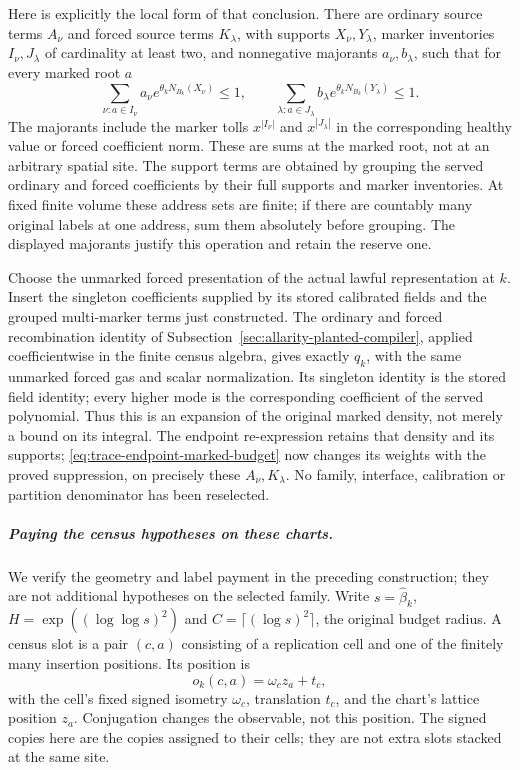 Here is explicitly the local form of that conclusion. There are
ordinary source terms $A_\nu$ and forced source terms $K_\lambda$,
with supports $X_\nu,Y_\lambda$, marker inventories
$I_\nu,J_\lambda$ of cardinality at least two, and nonnegative
majorants $a_\nu,b_\lambda$, such that for every marked root $a$
\[
 \sum_{\nu:a\in I_\nu}a_\nu e^{\theta_k N_{B_k}(X_\nu)}\le1,
 \qquad
 \sum_{\lambda:a\in J_\lambda}
             b_\lambda e^{\theta_k N_{B_k}(Y_\lambda)}\le1.
\]
The majorants include the marker tolls $x^{|I_\nu|}$ and
$x^{|J_\lambda|}$ in the corresponding healthy value or forced
coefficient norm. These are sums at the marked root, not at an
arbitrary spatial site. The support terms are obtained by grouping
the served ordinary and forced coefficients by their full supports
and marker inventories. At fixed finite volume these address sets
are finite; if there are countably many original labels at one
address, sum them absolutely before grouping. The displayed
majorants justify this operation and retain the reserve one.

Choose the unmarked forced presentation of the actual lawful
representation at $k$. Insert the singleton coefficients supplied by
its stored calibrated fields and the grouped multi-marker terms just
constructed. The ordinary and forced recombination identity of
Subsection~\ref{sec:allarity-planted-compiler}, applied coefficientwise
in the finite census algebra, gives exactly $q_k$, with the same
unmarked forced gas and scalar normalization. Its singleton identity
is the stored field identity; every higher mode is the corresponding
coefficient of the served polynomial. Thus this is an expansion of
the original marked density, not merely a bound on its integral.
The endpoint re-expression retains that density and its supports;
\eqref{eq:trace-endpoint-marked-budget} now changes its weights with
the proved suppression, on precisely these $A_\nu,K_\lambda$.
No family, interface, calibration or partition denominator has been
reselected.

\subparagraph{Paying the census hypotheses on these charts.}
We verify the geometry and label payment in the preceding construction;
they are not additional hypotheses on the selected family. Write
$s=\widehat\beta_k$, $H=\exp((\log\log s)^2)$ and
$C=\lceil(\log s)^2\rceil$, the original budget radius. A census
slot is a pair $(c,a)$ consisting of a replication cell and one of the
finitely many insertion positions. Its position is
\[
 o_k(c,a)=\omega_c z_a+t_c,
\]
with the cell's fixed signed isometry $\omega_c$, translation $t_c$,
and the chart's lattice position $z_a$. Conjugation changes the
observable, not this position. The signed copies here are the copies
assigned to their cells; they are not extra slots stacked at the same
site.

